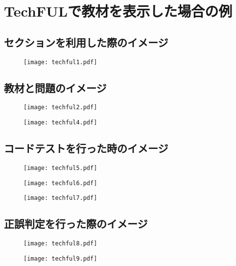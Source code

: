 \clearpage

\section{TechFULで教材を表示した場合の例}

\subsection{セクションを利用した際のイメージ}
\begin{figure}[H]
    \centering
    \texttt{[image: techful1.pdf]}
\end{figure}


\subsection{教材と問題のイメージ}

\begin{figure}[H]
    \centering
    \texttt{[image: techful2.pdf]}
\end{figure}
\begin{figure}[H]
    \centering
    \texttt{[image: techful4.pdf]}
\end{figure}

\subsection{コードテストを行った時のイメージ}

\begin{figure}[H]
    \centering
    \texttt{[image: techful5.pdf]}
\end{figure}
\begin{figure}[H]
    \centering
    \texttt{[image: techful6.pdf]}
\end{figure}
\begin{figure}[H]
    \centering
    \texttt{[image: techful7.pdf]}
\end{figure}

\subsection{正誤判定を行った際のイメージ}
\begin{figure}[H]
    \centering
    \texttt{[image: techful8.pdf]}
\end{figure}
\begin{figure}[H]
    \centering
    \texttt{[image: techful9.pdf]}
\end{figure}
